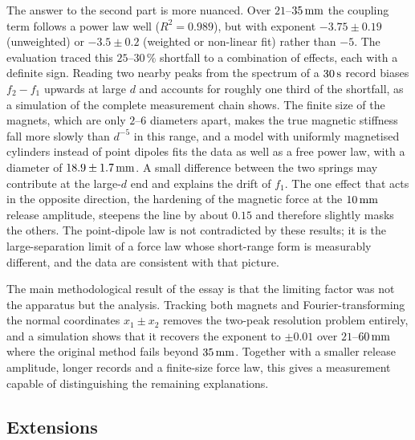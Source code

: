 The answer to the second part is more nuanced. Over $21$--$35\,\mathrm{mm}$ the coupling term follows a power law well ($R^2=0.989$), but with exponent $-3.75\pm0.19$ (unweighted) or $-3.5\pm0.2$ (weighted or non-linear fit) rather than $-5$. The evaluation traced this $25$--$30\,\%$ shortfall to a combination of effects, each with a definite sign. Reading two nearby peaks from the spectrum of a $30\,\mathrm{s}$ record biases $f_2-f_1$ upwards at large $d$ and accounts for roughly one third of the shortfall, as a simulation of the complete measurement chain shows. The finite size of the magnets, which are only $2$--$6$ diameters apart, makes the true magnetic stiffness fall more slowly than $d^{-5}$ in this range, and a model with uniformly magnetised cylinders instead of point dipoles fits the data as well as a free power law, with a diameter of $18.9\pm1.7\,\mathrm{mm}$. A small difference between the two springs may contribute at the large-$d$ end and explains the drift of $f_1$. The one effect that acts in the opposite direction, the hardening of the magnetic force at the $10\,\mathrm{mm}$ release amplitude, steepens the line by about $0.15$ and therefore slightly masks the others. The point-dipole law is not contradicted by these results; it is the large-separation limit of a force law whose short-range form is measurably different, and the data are consistent with that picture.

The main methodological result of the essay is that the limiting factor was not the apparatus but the analysis. Tracking both magnets and Fourier-transforming the normal coordinates $x_1\pm x_2$ removes the two-peak resolution problem entirely, and a simulation shows that it recovers the exponent to $\pm0.01$ over $21$--$60\,\mathrm{mm}$ where the original method fails beyond $35\,\mathrm{mm}$. Together with a smaller release amplitude, longer records and a finite-size force law, this gives a measurement capable of distinguishing the remaining explanations. 

\subsection{Extensions}

